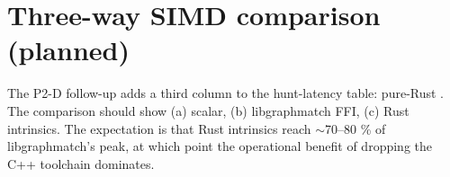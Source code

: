 \section{Three-way SIMD comparison (planned)}

The P2-D follow-up adds a third column to the hunt-latency table:
pure-Rust . The comparison should show (a) scalar,
(b) libgraphmatch FFI, (c) Rust intrinsics. The expectation is
that Rust intrinsics reach $\sim$70--80 \% of libgraphmatch's
peak, at which point the operational benefit of dropping the C++
toolchain dominates.
